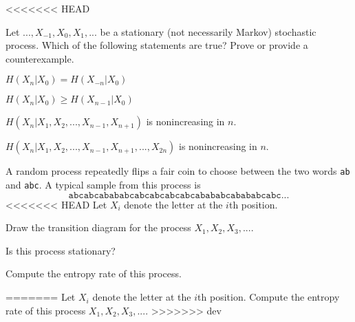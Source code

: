 \documentclass[a4paper,10pt,landscape,twocolumn]{scrartcl}
\begin{document}
<<<<<<< HEAD
\vspace{-0.5cm}


\begin{exercise} Let $..., X_{-1}, X_0, X_1, ...$ be a stationary (not necessarily Markov) stochastic process. Which of the following statements are true? Prove or provide a counterexample.
\begin{subex}
$H(X_n|X_0) = H(X_{-n}|X_0)$
\end{subex}
\begin{subex}
$H(X_n|X_0) \geq H(X_{n-1}|X_0)$
\end{subex}
\begin{subex}
$H(X_n|X_1, X_2, ..., X_{n-1}, X_{n+1})$ is nonincreasing in $n$.
\end{subex}
\begin{subex}
$H(X_n|X_1, X_2, ..., X_{n-1}, X_{n+1}, ..., X_{2n})$ is nonincreasing in $n$.
\end{subex}
\end{exercise}


\begin{exercise}
A random process repeatedly flips a fair coin to choose between the two words \texttt{ab} and \texttt{abc}. A typical sample from this process is
\[
\mathtt{a b c a b c a b a b a b c a b c a b c a b c a b c a b a b a b c a b a b a b c a b c ...}
\]
<<<<<<< HEAD
Let $X_i$ denote the letter at the $i$th position.
\begin{subex}
Draw the transition diagram for the process $X_1, X_2, X_3, ...$.
\end{subex}
\begin{subex}
Is this process stationary?
\end{subex}
\begin{subex}
Compute the entropy rate of this process.
\end{subex}
=======
Let $X_i$ denote the letter at the $i$th position. Compute the entropy rate of this process $X_1, X_2, X_3, ...$.
>>>>>>> dev
\end{exercise}
\end{document}
